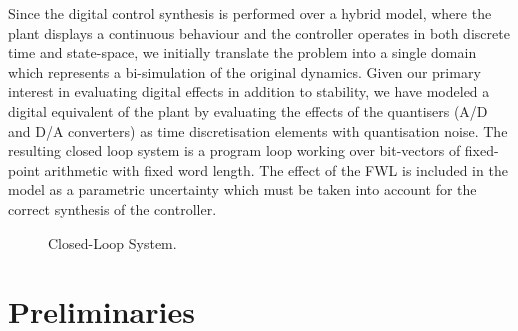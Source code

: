 \documentclass{sig-alternate-05-2015}
\begin{document}
Since the digital control synthesis is performed over a hybrid model,
where the plant displays a continuous behaviour and the controller
operates in both discrete time and state-space, we initially translate
the problem into a single domain which represents a bi-simulation of
the original dynamics. Given our primary interest in evaluating digital
effects in addition to stability, we have modeled a digital equivalent
of the plant by evaluating the effects of the quantisers (A/D and D/A
converters) as time discretisation elements with quantisation noise.
The resulting closed loop system is a program loop working over
bit-vectors of fixed-point arithmetic with fixed word length. The
effect of the FWL is included in the model as a parametric uncertainty
which must be taken into account for the correct synthesis of the
controller.

\begin{figure}
\centering
{}
 \caption{Closed-Loop System. \label{fig:closed-system}}
\end{figure}

\section{Preliminaries}
\end{document}
